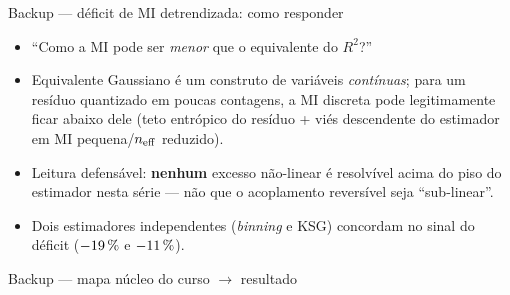 \documentclass[aspectratio=169,11pt]{beamer}
\begin{document}
\begin{frame}{Backup --- déficit de MI detrendizada: como responder}
  \begin{itemize}
    \item ``Como a MI pode ser \emph{menor} que o equivalente do $R^2$?''
    \item Equivalente Gaussiano é um construto de variáveis \emph{contínuas};
          para um resíduo quantizado em poucas contagens, a MI discreta
          pode legitimamente ficar abaixo dele (teto entrópico do resíduo
          + viés descendente do estimador em MI pequena/$n_{\mathrm{eff}}$ reduzido).
    \item Leitura defensável: \textbf{nenhum} excesso não-linear é
          resolvível acima do piso do estimador nesta série --- não que o
          acoplamento reversível seja ``sub-linear''.
    \item Dois estimadores independentes (\emph{binning} e KSG) concordam
          no sinal do déficit ($-19\,\%$ e
          $-11\,\%$).
  \end{itemize}
\end{frame}

\begin{frame}{Backup --- mapa n\'ucleo do curso $\rightarrow$ resultado}
  \centering
\end{frame}
\end{document}
